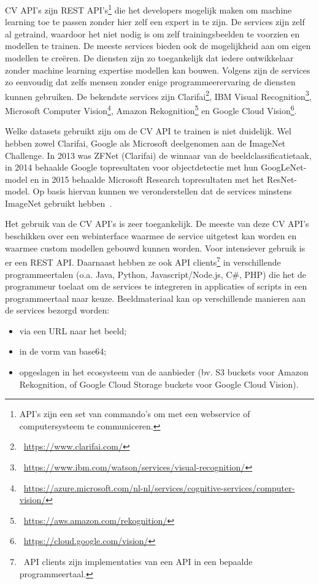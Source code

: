 CV API’s zijn REST API’s\footnote{API's zijn een set van commando's om met een webservice of computersysteem te communiceren.} die het developers mogelijk maken om machine learning toe te passen zonder hier zelf een expert in te zijn.  De services zijn zelf al getraind, waardoor het niet nodig is om zelf trainingsbeelden te voorzien en modellen te trainen. De meeste services bieden ook de mogelijkheid aan om eigen modellen te cre\"{e}ren. De diensten zijn zo toegankelijk dat iedere ontwikkelaar zonder machine learning expertise modellen kan bouwen. Volgens \textcite{Lardinois2018} zijn de services zo eenvoudig dat zelfs mensen zonder enige programmeerervaring de diensten kunnen gebruiken. De bekendste services zijn Clarifai\footnote{~\url{https://www.clarifai.com/}}, IBM Visual Recognition\footnote{~\url{https://www.ibm.com/watson/services/visual-recognition/}}, Microsoft Computer Vision\footnote{~\url{https://azure.microsoft.com/nl-nl/services/cognitive-services/computer-vision/}}, Amazon Rekognition\footnote{~\url{https://aws.amazon.com/rekognition/}} en Google Cloud Vision\footnote{~\url{https://cloud.google.com/vision/}}. 

Welke datasets gebruikt zijn om de CV API te trainen is niet duidelijk. Wel hebben zowel Clarifai, Google als Microsoft deelgenomen aan de ImageNet Challenge. In 2013 was ZFNet (Clarifai) de winnaar van de beeldclassificatietaak, in 2014 behaalde Google topresultaten voor objectdetectie met hun GoogLeNet-model en in 2015 behaalde Microsoft Research topresultaten met het ResNet-model. Op basis hiervan kunnen we veronderstellen dat de services minstens ImageNet gebruikt hebben~\autocite{Brownlee2019a}.

Het gebruik van de CV API’s is zeer toegankelijk. De meeste van deze CV API’s beschikken over een webinterface waarmee de service uitgetest kan worden en waarmee custom modellen gebouwd kunnen worden. Voor intensiever gebruik is er een REST API. Daarnaast hebben ze ook API clients\footnote{~API clients zijn implementaties van een API in een bepaalde programmeertaal.} in verschillende programmeertalen (o.a. Java, Python, Javascript/Node.js, C\#, PHP) die het de programmeur toelaat om de services te integreren in applicaties of scripts in een programmeertaal naar keuze. Beeldmateriaal kan op verschillende manieren aan de services bezorgd worden:
\begin{itemize}
	\item via een URL naar het beeld;
	\item in de vorm van base64;
	\item opgeslagen in het ecosysteem van de aanbieder (bv. S3 buckets voor Amazon Rekognition, of Google Cloud Storage buckets voor Google Cloud Vision).
\end{itemize}

